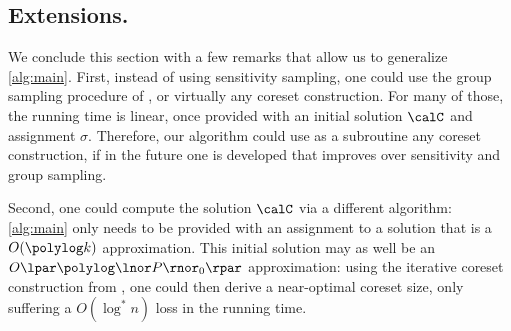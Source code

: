 %
%
%
%
%

\subsection*{Extensions.} 
We conclude this section with a few remarks that allow us to generalize \cref{alg:main}.
First, instead of using sensitivity sampling, one could use the group sampling procedure of \cite{stoc21}, or virtually any coreset construction. For many of those, the running time is linear, once provided with an initial solution $\calC$ and assignment $\sigma$. 
Therefore, our algorithm could use as a subroutine any coreset construction, if in the future one is developed that improves over sensitivity and group sampling.

Second, one could compute the solution $\calC$ via a different algorithm: \cref{alg:main} only needs to be provided with an assignment to a solution that is a $O(\polylog k)$ approximation. 
This initial solution may as well be an $O\lpar\polylog \lnor P \rnor_0 \rpar$ approximation: using the iterative coreset construction from \cite{BravermanJKW21}, one could then derive a near-optimal coreset size, only suffering a $O(\log^* n)$ loss in the running time.

